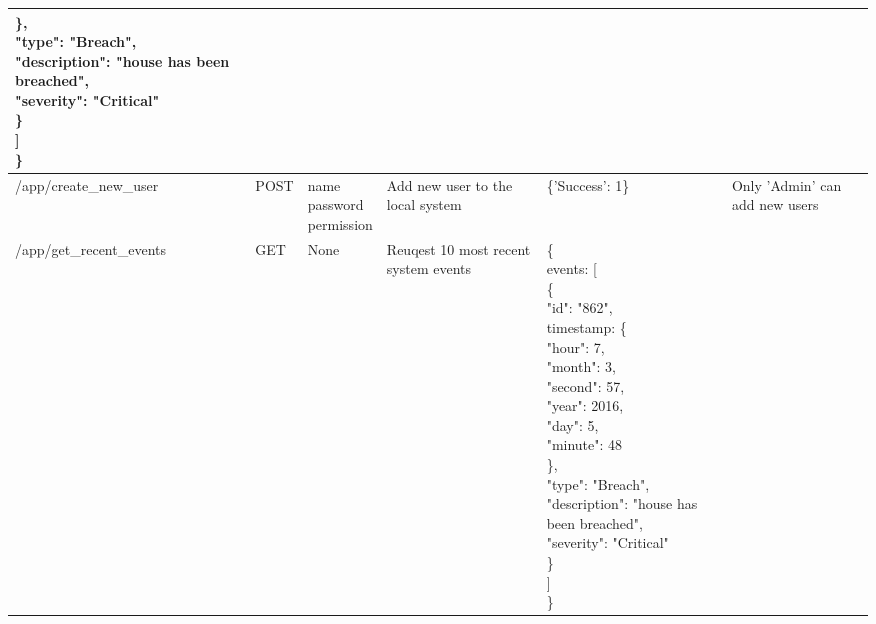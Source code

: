 \documentclass[10pt]{article}
\begin{document}
\begin{table}[ht]
{\begin{tabular}{| l | l | l | p{3cm} | p{6.5cm} | l |}
{             			\qquad \quad \}, \\ 
             			\qquad \quad "type": "Breach", \\ 
             			\qquad \quad "description": "house has been breached", \\ 
             			\qquad \quad "severity": "Critical" \\ 
             		\qquad \quad \} \\ 
             	\qquad ] \\ 
             \quad \} \\
           } & \\ \hline
     /app/create\_new\_user & POST & \pbox{25cm}{name \\ password \\ permission} & Add new user to the local system & \{'Success': 1\} & Only 'Admin' can add new users \\ \hline
     /app/get\_recent\_events & GET & None & Reuqest 10 most recent system events & \pbox{25cm}{\{ \\ 
             	\quad events: [ \\ 
             		\qquad \{ \\ 
             		\qquad \quad "id": "862", \\
             			\qquad \quad timestamp: \{ \\ 
             				\qquad \quad \quad "hour": 7, \\ 
       					    \qquad \quad \quad "month": 3, \\ 
                            \qquad \quad \quad "second": 57, \\ 
             				\qquad \quad \quad "year": 2016, \\ 
             				\qquad \quad \quad "day": 5, \\ 
             				\qquad \quad \quad "minute": 48 \\ 
             			\qquad \quad \}, \\ 
             			\qquad \quad "type": "Breach", \\ 
             			\qquad \quad "description": "house has been breached", \\ 
             			\qquad \quad "severity": "Critical" \\ 
             		\qquad \quad \} \\ 
             	\qquad ] \\ 
             \quad \} \\
           } & \\ \hline

\end{tabular}}
\end{table}
\end{document}
